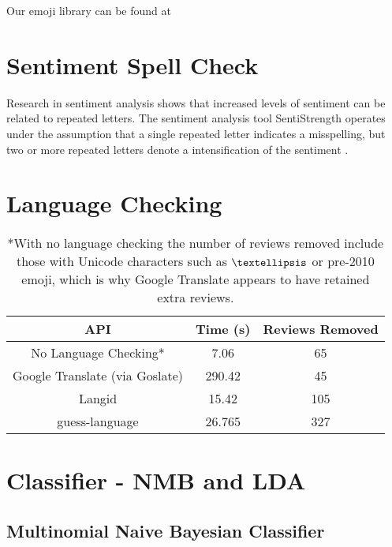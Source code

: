 \documentclass{acm_proc_article-sp}
\begin{document}
 
 
 Our emoji library can be found at 
 



\section{Sentiment Spell Check}

Research in sentiment analysis  shows that increased levels of sentiment can be related to repeated letters.
The sentiment analysis tool SentiStrength operates under the assumption that a single repeated letter indicates a misspelling, but two or more repeated letters denote a intensification of the sentiment .



\section{Language Checking}

\begin{table}
	

\begin{tabular}{|c | c | c|} \hline
	API & Time (s) &  Reviews Removed \\ \hline
	No Language Checking* & 7.06 & 65  \\
	Google Translate (via Goslate) & 290.42 & 45 \\
	Langid & 15.42 & 105 \\
	guess-language & 26.765 & 327    \\ \hline
	
\end{tabular}
\caption{ *With no language checking the number of reviews removed include those with Unicode characters such as $\textellipsis$ or pre-2010 emoji, which is why Google Translate appears to have retained extra reviews. }
\end{table}

\section{Classifier - NMB and LDA}

\subsection{Multinomial Naive Bayesian Classifier}
\end{document}

